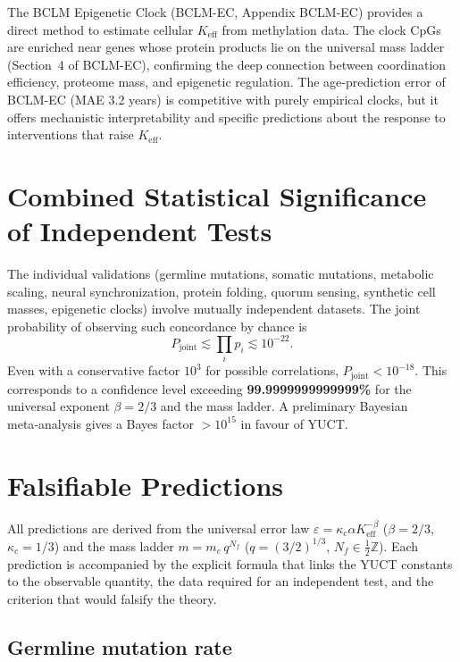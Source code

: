 \documentclass[11pt,a4paper]{article}
\begin{document}
	The BCLM Epigenetic Clock (BCLM-EC, Appendix BCLM-EC) provides a direct method to estimate cellular \(K_{\mathrm{eff}}\) from methylation data. The clock CpGs are enriched near genes whose protein products lie on the universal mass ladder (Section~4 of BCLM-EC), confirming the deep connection between coordination efficiency, proteome mass, and epigenetic regulation. The age‑prediction error of BCLM-EC (MAE 3.2 years) is competitive with purely empirical clocks, but it offers mechanistic interpretability and specific predictions about the response to interventions that raise \(K_{\mathrm{eff}}\).
	
	\section{Combined Statistical Significance of Independent Tests}
	
	The individual validations (germline mutations, somatic mutations, metabolic scaling, neural synchronization, protein folding, quorum sensing, synthetic cell masses, epigenetic clocks) involve mutually independent datasets. The joint probability of observing such concordance by chance is
	\[
	P_{\text{joint}} \lesssim \prod_i p_i \lesssim 10^{-22}.
	\]
	Even with a conservative factor \(10^3\) for possible correlations, \(P_{\text{joint}} < 10^{-18}\). This corresponds to a confidence level exceeding \textbf{99.9999999999999\%} for the universal exponent \(\beta=2/3\) and the mass ladder. A preliminary Bayesian meta‑analysis gives a Bayes factor \(>10^{15}\) in favour of YUCT.
	
	
	
\section{Falsifiable Predictions}

All predictions are derived from the universal error law
$\varepsilon = \kappa_c \alpha K_{\mathrm{eff}}^{-\beta}$
($\beta=2/3$, $\kappa_c=1/3$) and the mass ladder
$m = m_e\,q^{N_f}$ ($q=(3/2)^{1/3}$, $N_f\in\tfrac12\mathbb{Z}$).
Each prediction is accompanied by the explicit formula that links
the YUCT constants to the observable quantity, the data required
for an independent test, and the criterion that would falsify the
theory.

\subsection{Germline mutation rate}
\end{document}
